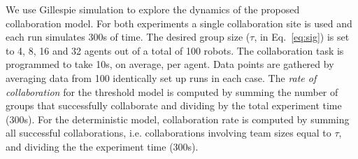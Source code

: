\documentclass{TeXstyles/DARS/svmult}  %
\begin{document}
We use Gillespie simulation \cite{gillespie76} to explore the dynamics of the proposed collaboration model.
For both experiments a single collaboration site is used and each run simulates 300s of time. The desired group size ($\tau$, in Eq.~\eqref{eq:sig}) is set to 4, 8, 16 and 32 agents out of a total of 100 robots. The collaboration task is programmed to take 10s, on average, per agent. Data points are gathered by averaging data from 100 identically set up runs in each case. The \emph{rate of collaboration} for the threshold model is computed by summing the number of groups that successfully collaborate and dividing by the total experiment time (300s). For the deterministic model, collaboration rate is computed by summing all successful collaborations, i.e. collaborations involving team sizes equal to $\tau$, and dividing the the experiment time (300s).


\end{document}
